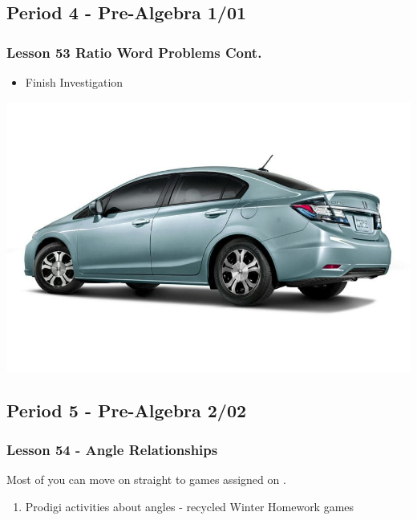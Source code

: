       
   	 \subsection[PA1/01]{Period 4 - Pre-Algebra 1/01}
   	 \begin{frame}[label=PA1_01]
       		\frametitle{Lesson 53 Ratio Word Problems Cont.}   	
       		
       		\begin{itemize}
       			\item Finish  Investigation 
       		\end{itemize}   
       		\vspace{-20pt}
       		\begin{center}
       			\includegraphics[width=0.5\linewidth]{Images/honda_civic}
       		\end{center}      
       		\vspace{-20pt}
       	\end{frame}
       
    	 
   	 \subsection[PA2/02]{Period 5 - Pre-Algebra 2/02}
   	 \begin{frame}[label=PA2_02]
   	 \frametitle{Lesson 54 - Angle Relationships}   	
   	 
   	 \begin{alertblock}{}
   	 	Most of you can move on straight to  games assigned on \mangahightext. \\
   	 \end{alertblock}
   	 
   	 \begin{enumerate}
   	 	\item \mangahightext
   	 	\rightarrowitem Prodigi activities about angles - recycled Winter Homework
   	 	\rightarrowitem {} games
   	 \end{enumerate}
   	  \end{frame}
   	 	
